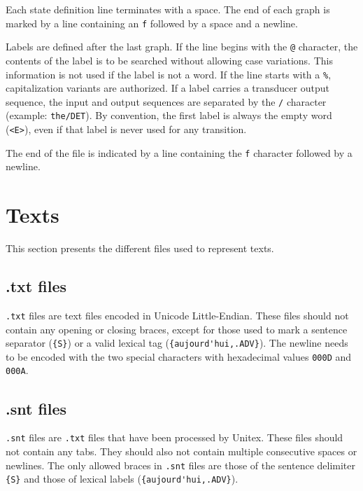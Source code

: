 \bigskip
\noindent Each state definition line terminates with a space. The end of each
graph is marked by a line containing an \verb+f+ followed by a space and a
newline.

\bigskip
\noindent Labels are defined after the last graph. If the line begins with the
\verb+@+ character, the contents of the label is to be searched without allowing
case variations. This information is not used if the label is not a word. If the
line starts with a \verb+%+, capitalization variants are authorized. If a label
carries a transducer output sequence, the input and output sequences are
separated by the \verb+/+  character (example: \verb+the/DET+). By convention,
the first label is always the empty word (\verb+<E>+), even if that label is
never used for any transition.

\bigskip
\noindent The end of the file is indicated by a line containing the \verb+f+
character followed by a newline.



\section{Texts}
This section presents the different files used to represent texts.
\subsection{.txt files}
\label{section-texts}
\verb+.txt+ files are text files encoded in Unicode Little-Endian. These files
should not contain any opening or closing braces, except for those used to mark a
sentence separator (\verb+{S}+) or a valid lexical tag
(\verb+{aujourd'hui,.ADV}+). The newline needs to be encoded with the two special
characters with hexadecimal values \verb+000D+ and \verb+000A+.


\subsection{.snt files}
\verb+.snt+ files are \verb+.txt+ files that have been processed by Unitex. These
files should not contain any tabs. They should also not contain multiple
consecutive spaces or newlines. The only allowed braces in \verb+.snt+ files are
those of the sentence delimiter \verb+{S}+ and those of lexical labels
(\verb+{aujourd'hui,.ADV}+).


